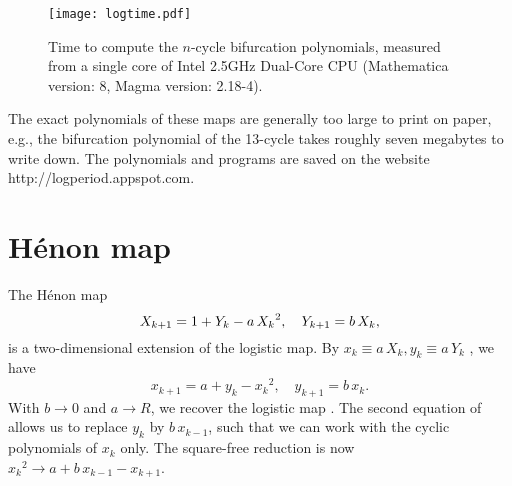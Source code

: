\documentclass{ws-ijbc}
\begin{document}
\begin{figure}[h]
  \begin{center}
  \begin{minipage}{\linewidth}
        \texttt{[image: logtime.pdf]}
  \end{minipage}%
  \end{center}
  \caption{\label{fig:logtime}
  Time to compute the $n$-cycle bifurcation polynomials,
    measured from a single core of
    Intel\textsuperscript{\textregistered} 2.5GHz Dual-Core CPU
  (Mathematica version: 8, Magma version: 2.18-4).
  }
\end{figure}
%






%
The exact polynomials of these maps are generally too large to print on paper,
  e.g., the bifurcation polynomial of the 13-cycle
    takes roughly seven megabytes to write down.
%
The polynomials and programs are saved on the website
http://logperiod.appspot.com.
%






\section{\label{sec:henon}H\'enon map}




The H\'enon map \cite{henon}
\begin{equation}
  X_{k+1} = 1 + Y_k - a \, {X_k}^2, \quad
  Y_{k+1} = b \, X_k,
\notag
\end{equation}
is a two-dimensional extension of the logistic map.
%
By
  $x_k \equiv a \, X_k,
   y_k \equiv a \, Y_k$
\cite{huang},
we have
\begin{equation}
  x_{k+1} = a + y_k - {x_k}^2, \quad
  y_{k+1} = b \, x_k.
\label{eq:henons}
\end{equation}
%
%
With $b \rightarrow 0$ and $a \rightarrow R$,
we recover the logistic map .
%
%
The second equation of 
allows us to replace $y_k$ by $b \, x_{k-1}$,
  such that we can work with the cyclic polynomials of $x_k$ only.
The square-free reduction is now
  ${x_k}^2 \rightarrow a + b \, x_{k-1} - x_{k+1}$.
\end{document}
